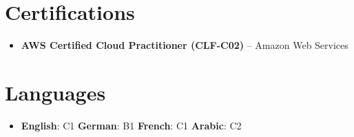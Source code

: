 \documentclass[a4paper,11pt]{article}
\newcommand{\resumeItemListStart}{\begin{justify}\begin{itemize}[leftmargin=3ex, rightmargin=2ex, labelsep=1.2mm,itemsep=0.5pt,parsep=0.5pt,topsep=1pt]\normalsize}
\newcommand{\resumeItemListEnd}{\end{itemize}\end{justify}\vspace{-0.5mm}}
\begin{document}
\section{\textbf{Certifications}}
\resumeItemListStart
\item{\textbf{AWS Certified Cloud Practitioner (CLF-C02)} – Amazon Web Services}
\resumeItemListEnd

\section{\textbf{Languages}}
\resumeItemListStart
\item{\textbf{English}: C1 \hfill \textbf{German}: B1 \hfill \textbf{French}: C1 \hfill \textbf{Arabic}: C2 }
\resumeItemListEnd
    
\end{document}
